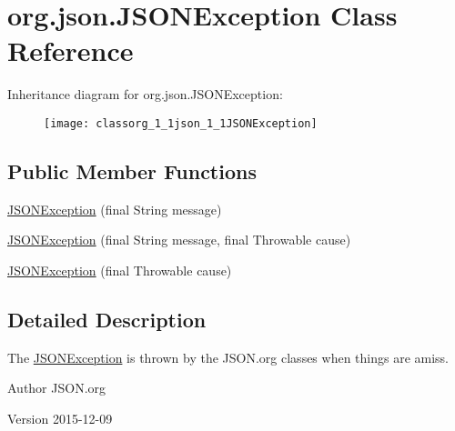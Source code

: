 \hypertarget{classorg_1_1json_1_1JSONException}{\section{org.\-json.\-J\-S\-O\-N\-Exception Class Reference}
\label{classorg_1_1json_1_1JSONException}
}
Inheritance diagram for org.\-json.\-J\-S\-O\-N\-Exception\-:\begin{figure}[H]
\begin{center}
\leavevmode
\texttt{[image: classorg\_1\_1json\_1\_1JSONException]}
\end{center}
\end{figure}
\subsection*{Public Member Functions}
\begin{DoxyCompactItemize}
\item 
\hyperlink{classorg_1_1json_1_1JSONException_a77f0c9e65c7ea12af42cebe7c4901299}{J\-S\-O\-N\-Exception} (final String message)
\item 
\hyperlink{classorg_1_1json_1_1JSONException_a009cb10b2921e438cc34db60f80bc441}{J\-S\-O\-N\-Exception} (final String message, final Throwable cause)
\item 
\hyperlink{classorg_1_1json_1_1JSONException_afec2b0f45f6e11544c0a2e7b23e361a9}{J\-S\-O\-N\-Exception} (final Throwable cause)
\end{DoxyCompactItemize}


\subsection{Detailed Description}
The \hyperlink{classorg_1_1json_1_1JSONException}{J\-S\-O\-N\-Exception} is thrown by the J\-S\-O\-N.\-org classes when things are amiss.

\begin{DoxyAuthor}{Author}
J\-S\-O\-N.\-org 
\end{DoxyAuthor}
\begin{DoxyVersion}{Version}
2015-\/12-\/09 
\end{DoxyVersion}


